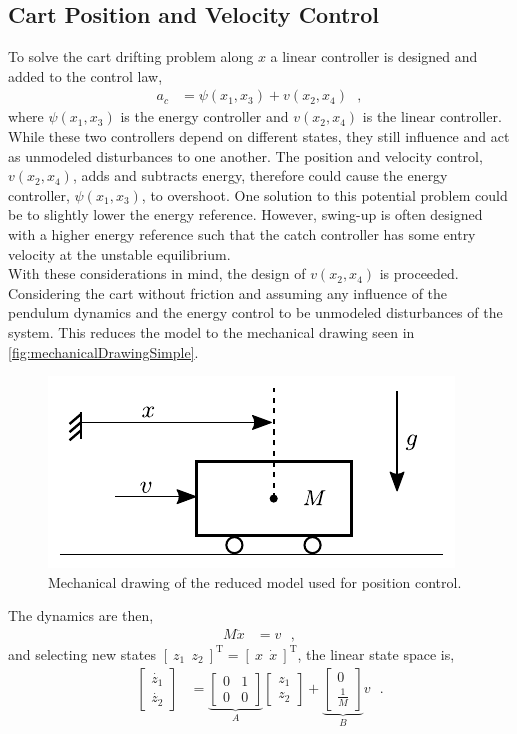 \subsection{Cart Position and Velocity Control}
To solve the cart drifting problem along $x$ a linear controller is designed and added to the control law,
\begin{align}
  a_c &= \psi(x_1,x_3) + v(x_2,x_4) \ \ \ ,   \label{eq:combiControl} 
\end{align}
where $\psi(x_1,x_3)$ is the energy controller and $v(x_2,x_4)$ is the linear controller. While these two controllers depend on different states, they still influence and act as unmodeled disturbances to one another. The position and velocity control, $v(x_2,x_4)$, adds and subtracts energy, therefore could cause the energy controller, $\psi(x_1,x_3)$, to overshoot. One solution to this potential problem could be to slightly lower the energy reference. However, swing-up is often designed with a higher energy reference such that the catch controller has some entry velocity at the unstable equilibrium.\\
With these considerations in mind, the design of $v(x_2,x_4)$ is proceeded. Considering the cart without friction and assuming any influence of the pendulum dynamics and the energy control to be unmodeled disturbances of the system. This reduces the model to the mechanical drawing seen in \autoref{fig:mechanicalDrawingSimple}.
%
\begin{figure}[H]
  \includegraphics[width=.35\textwidth]{figures/mechanicalDrawingSimple}
  \caption{Mechanical drawing of the reduced model used for position control.}
  \label{fig:mechanicalDrawingSimple}
\end{figure}
%
The dynamics are then,
\begin{align}
  M \ddot{x} &=  v \ \ \ ,  \label{eq:simpleDynamics} 
\end{align}
and selecting new states $ [\ z_1\ \ z_2\ ]^\mathrm{T} = [\ x\ \ \dot{x}\ ]^\mathrm{T} $, the linear state space is,\vspace{6pt}
\begin{align}
  \begin{bmatrix}
    \dot{z_1} \\
    \dot{z_2}
  \end{bmatrix}
  &=
  \underbrace{
    \begin{bmatrix}
      0 & 1 \\
      0 & 0
    \end{bmatrix}
  }_{A}
  \begin{bmatrix}
    z_1 \\
    z_2
  \end{bmatrix}
  +
  \underbrace{
    \begin{bmatrix}
      0 \\
      \tfrac{1}{M}
    \end{bmatrix}
  }_{B}
  v
  \label{eq:simpleLinearStateSpace} \ \ \ .
\end{align}
